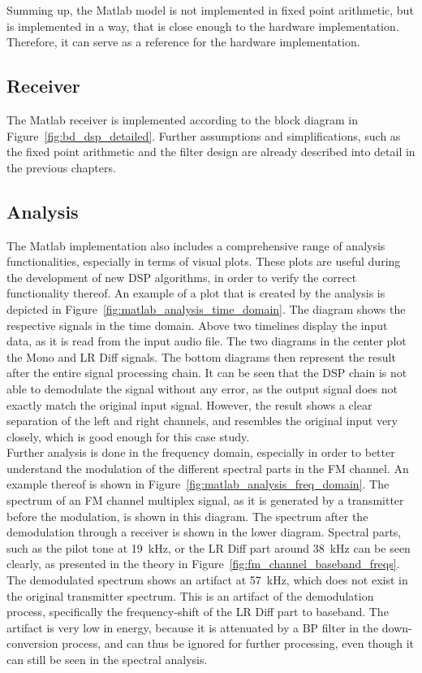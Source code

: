 Summing up, the Matlab model is not implemented in fixed point arithmetic, but is implemented in a way, that is close enough to the hardware implementation.
Therefore, it can serve as a reference for the hardware implementation.\\


\subsection{Receiver}

The Matlab receiver is implemented according to the block diagram in Figure~\ref{fig:bd_dsp_detailed}.
Further assumptions and simplifications, such as the fixed point arithmetic and the filter design are already described into detail in the previous chapters.

\subsection{Analysis}

The Matlab implementation also includes a comprehensive range of analysis functionalities, especially in terms of visual plots.
These plots are useful during the development of new DSP algorithms, in order to verify the correct functionality thereof.
An example of a plot that is created by the analysis is depicted in Figure~\ref{fig:matlab_analysis_time_domain}.
The diagram shows the respective signals in the time domain.
Above two timelines display the input data, as it is read from the input audio file.
The two diagrams in the center plot the Mono and LR Diff signals.
The bottom diagrams then represent the result after the entire signal processing chain.
It can be seen that the DSP chain is not able to demodulate the signal without any error, as the output signal does not exactly match the original input signal.
However, the result shows a clear separation of the left and right channels, and resembles the original input very closely, which is good enough for this case study.\\

Further analysis is done in the frequency domain, especially in order to better understand the modulation of the different spectral parts in the FM channel.
An example thereof is shown in Figure~\ref{fig:matlab_analysis_freq_domain}.
The spectrum of an FM channel multiplex signal, as it is generated by a transmitter before the modulation, is shown in this diagram.
The spectrum after the demodulation through a receiver is shown in the lower diagram.
Spectral parts, such as the pilot tone at 19~kHz, or the LR Diff part around 38~kHz can be seen clearly, as presented in the theory in Figure~\ref{fig:fm_channel_baseband_freqs}.
The demodulated spectrum shows an artifact at 57~kHz, which does not exist in the original transmitter spectrum.
This is an artifact of the demodulation process, specifically the frequency-shift of the LR Diff part to baseband.
The artifact is very low in energy, because it is attenuated by a BP filter in the down-conversion process, and can thus be ignored for further processing, even though it can still be seen in the spectral analysis.

